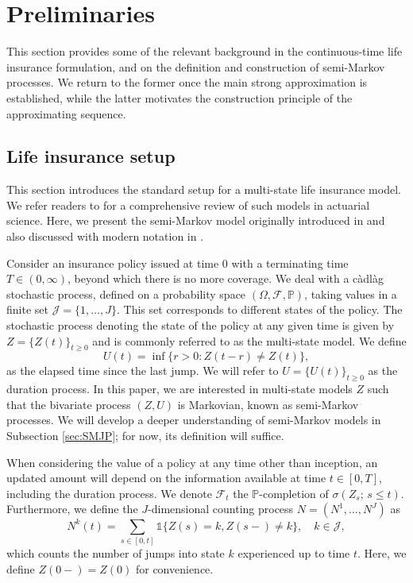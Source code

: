 \documentclass[11pt,leqno]{amsart}
\numberwithin{table}{section}
\numberwithin{figure}{section}
\numberwithin{equation}{section}
\newcommand{\1}{{\mathds{1}}}
\newcommand{\0}{\mat{0}}
\begin{document}
\section{Preliminaries}
\label{sec:preliminaries}
This section provides some of the relevant background in the continuous-time life insurance formulation, and on the definition and construction of semi-Markov processes. We return to the former once the main strong approximation is established, while the latter motivates the construction principle of the approximating sequence.

\subsection{Life insurance setup}\label{sec:setup}
This section introduces the standard setup for a multi-state life insurance model. { We refer readers to \cite{norberg1991reserves,milbrodt1997markov,milbrodt1999hattendorff,milbrodt2000hattendorff,buchardt2015life} for a comprehensive review of such models in actuarial science.} Here, we present the semi-Markov model originally introduced in \cite{hoem1972inhomogeneous} and also discussed with modern notation in \cite{buchardt2015cash}.

Consider an insurance policy issued at time $0$ with a terminating time $T\in (0,\infty)$, beyond which there is no more coverage. We deal with a c\`adl\`ag stochastic process, defined on a probability space $(\Omega, \mathcal{F}, \mathds{P})$, taking values in a finite set $\mathcal{J}=\{1,\dots,J\}$. This set corresponds to different states of the policy. The stochastic process denoting the state of the policy at any given time is given by $Z=\{Z(t)\}_{t\ge 0}$
and is commonly referred to as the multi-state model. We define 
\begin{equation}\label{eq:U_def1}U(t)=\inf\{r>0: Z(t-r)\neq Z(t)\},\end{equation}
as the elapsed time since the last jump. We will refer to $U=\{U(t)\}_{t\ge 0}$ as the duration process. In this paper, we are interested in multi-state models $Z$ such that the bivariate process $(Z,U)$ is Markovian, known as semi-Markov processes. We will develop a deeper understanding of semi-Markov models in Subsection \ref{sec:SMJP}; for now, its definition will suffice.

When considering the value of a policy at any time other than inception, an updated amount will depend on the information available at time $t\in[0,T]$, including the duration process. {We denote $\mathcal{F}_t$ the $\mathds{P}$-completion of $\sigma(Z_s;\,s\le t)$.} Furthermore, we define the $J$-dimensional counting process $N=(N^1,\dots, N^J)$ as 
\[ N^k(t)=\sum_{s\in[0,t]} \1\{Z(s)=k,Z(s-)\neq k\},\quad k\in\mathcal{J}, \]
which counts the number of jumps into state $k$ experienced up to time $t$. {Here, we define $Z(0-)=Z(0)$ for convenience.}
\end{document}

